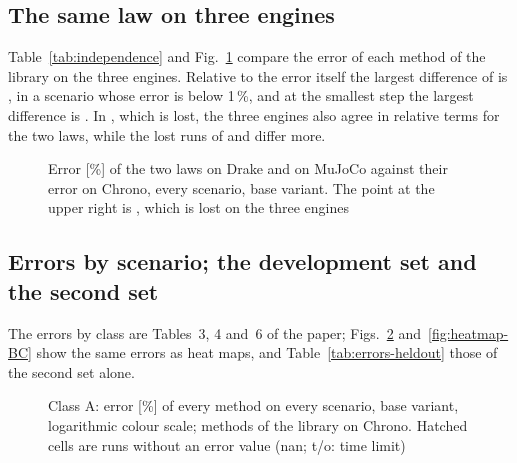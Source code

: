 \begin{table}[!htbp]
\caption{Runs that did not finish with an error value, by method and status}
\label{tab:status}
\end{table}

\subsection{The same law on three engines}

Table~\ref{tab:independence} and Fig.~\ref{fig:independence} compare the error of each method
of the library on the three engines. Relative to the error itself the largest difference of
 is , in a scenario whose error is below
1\,\%, and at the smallest step the largest difference is
. In , which is lost, the three engines also
agree in relative terms for the two laws, while the lost runs of  and
 differ more.

\begin{table}[!htbp]
\caption{Largest spread of the error of each method of the library over the three engines,
base variant. Held: scenarios with an error below 100\,\% on every engine; lost: the others,
left out of the next columns. pp: percentage points}
\label{tab:independence}
\end{table}

\begin{figure}[!htbp]
\centering
{}
\caption{Error [\%] of the two laws on Drake and on MuJoCo against their error on Chrono, every
scenario, base variant. The point at the upper right is , which is lost on the
three engines}
\label{fig:independence}
\end{figure}

\subsection{Errors by scenario; the development set and the second set}\label{sup:errors}

The errors by class are Tables~3, 4 and~6 of the paper; Figs.~\ref{fig:heatmap-A}
and~\ref{fig:heatmap-BC} show the same errors as heat maps, and
Table~\ref{tab:errors-heldout} those of the second set alone.

\begin{figure}[!htbp]
\centering
{}
\caption{Class A: error [\%] of every method on every scenario, base variant, logarithmic colour
scale; methods of the library on Chrono. Hatched cells are runs without an error value (nan;
t/o: time limit)}
\label{fig:heatmap-A}
\end{figure}

